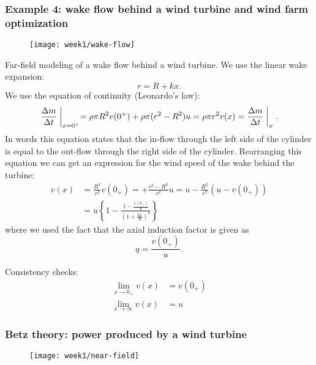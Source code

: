 \subsubsection{Example 4: wake flow behind a wind turbine and wind farm optimization}
\begin{figure}[h!]
    \centering
    \texttt{[image: week1/wake-flow]}
    \caption{}
    \label{fig:wake-flow}
\end{figure}
Far-field modeling of a wake flow behind a wind turbine. We use the linear wake expansion:
\begin{equation}
    r = R + kx.
    \label{}
\end{equation}
We use the equation of continuity (Leonardo's law):
\begin{equation}
    \frac{\Delta m}{\Delta t}\biggm\vert_{x=0^+} = \rho\pi R^2v(0^+) + \rho\pi(r^2-R^2)u = \rho\pi r^2 v(x) = \frac{\Delta m}{\Delta t}\biggm\vert_x.
    \label{}
\end{equation}
In words this equation states that the in-flow through the left side of the cylinder is equal to the out-flow through the right side of the cylinder. Rearranging this equation we can get an expression for the wind speed of the wake behind the turbine:
\begin{align}
    v(x) &= \frac{R^2}{r^2}v(0_+)=+\frac{r^2-R^2}{r^2}u = u-\frac{R^2}{r^2}\left(u-v(0_+)\right)\\
    &= u \left\{1-\frac{1-\frac{v(0_+)}{u}}{\left(1+\frac{kx}{R}\right)^2}\right\}
    \label{eq:v-x}
\end{align}
where we used the fact that the axial induction factor is given as
\begin{equation}
    q = \frac{v(0_+)}{u}.
\end{equation}

Consistency checks:
\begin{align}
    \lim_{x\rightarrow 0_+} v(x) &= v(0_+)\\
    \lim_{x\rightarrow\infty} v(x) &= u
\end{align}


\subsubsection*{Betz theory: power produced by a wind turbine}
\begin{figure}[h!]
    \centering
    \texttt{[image: week1/near-field]}
    \caption{}
    \label{fig:betz}
\end{figure}

